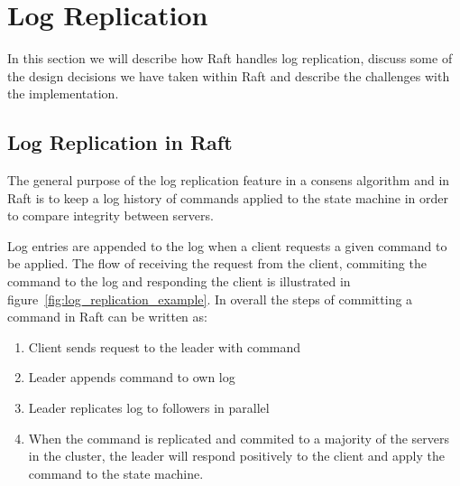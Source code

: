 \section{Log Replication} %
\label{sec:log_replication}

In this section we will describe how Raft handles log replication, discuss some of the design decisions we have taken within Raft and describe the challenges with the implementation.

\subsection{Log Replication in Raft} %
\label{sub:log_replication_in_raft}

The general purpose of the log replication feature in a consens algorithm and in Raft is to keep a log history of commands applied to the state machine in order to compare integrity between servers.

Log entries are appended to the log when a client requests a given command to be applied. The flow of receiving the request from the client, commiting the command to the log and responding the client is illustrated in figure~\ref{fig:log_replication_example}. In overall the steps of committing a command in Raft can be written as:

\begin{enumerate}
  \item Client sends request to the leader with command
  \item Leader appends command to own log
  \item Leader replicates log to followers in parallel
  \item When the command is replicated and commited to a majority of the servers in the cluster, the leader will respond positively to the client and apply the command to the state machine. \label{enum:client_request_final}

\end{enumerate}

